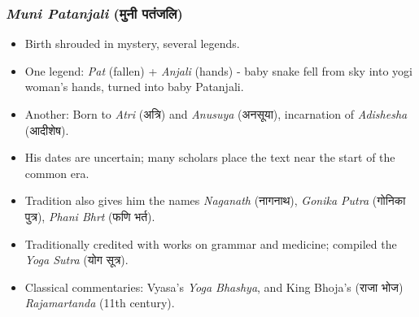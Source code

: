 \begin{frame}[fragile]\frametitle{\textit{Muni Patanjali} (मुनी पतंजलि)}

    \begin{itemize}
        \item Birth shrouded in mystery, several legends.
        \item One legend: \textit{Pat} (fallen) + \textit{Anjali} (hands) - baby snake fell from sky into yogi woman’s hands, turned into baby Patanjali.
        \item Another: Born to \textit{Atri} (अत्रि) and \textit{Anusuya} (अनसूया), incarnation of \textit{Adishesha} (आदीशेष).
        \item His dates are uncertain; many scholars place the text near the start of the common era.
        \item Tradition also gives him the names \textit{Naganath} (नागनाथ), \textit{Gonika Putra} (गोनिका पुत्र), \textit{Phani Bhrt} (फणि भर्त).
        \item Traditionally credited with works on grammar and medicine; compiled the \textit{Yoga Sutra} (योग सूत्र).
        \item Classical commentaries: Vyasa's \textit{Yoga Bhashya}, and King Bhoja's (राजा भोज) \textit{Rajamartanda} (11th century).
    \end{itemize}

\end{frame}





